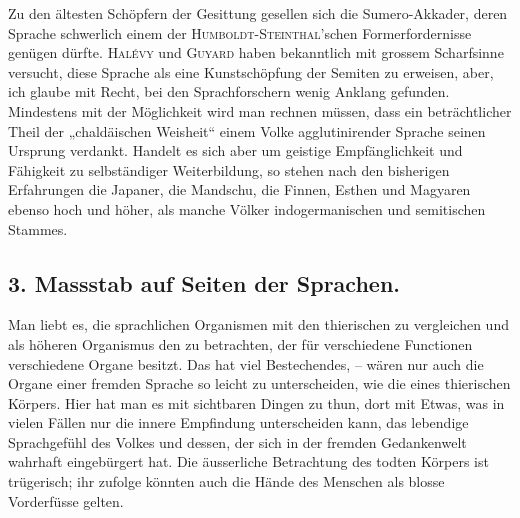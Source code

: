 
Zu den ältesten Schöpfern der Gesittung gesellen sich die Sumero-Akkader, deren Sprache schwerlich einem der \textsc{Humboldt-Steinthal}’schen Formerfordernisse genügen dürfte. \textsc{Halévy} und \textsc{Guyard} haben bekanntlich mit grossem Scharfsinne versucht, diese Sprache als eine Kunstschöpfung der Semiten zu erweisen, aber, ich glaube mit Recht, bei den Sprachforschern wenig Anklang gefunden. Mindestens mit der Möglichkeit wird man rechnen müssen, dass ein beträchtlicher Theil der „chaldäischen Weisheit“ einem Volke agglutinirender Sprache seinen Ursprung verdankt. Handelt es sich aber um geistige Empfänglichkeit und Fähigkeit zu selbständiger Weiterbildung, so stehen nach den bisherigen Erfahrungen die Japaner, die Mandschu, die Finnen, Esthen und Magyaren ebenso hoch und höher, als manche Völker indogermanischen und semitischen Stammes. 

\subsection*{3. Massstab auf Seiten der Sprachen.}\label{IV.IV.3}

Man liebt es, die sprachlichen Organismen mit den thierischen zu vergleichen und als höheren Organismus den zu betrachten, der für verschiedene Functionen verschiedene Organe besitzt. Das hat viel Bestechendes, – wären nur auch die Organe einer fremden Sprache so leicht zu unterscheiden, wie die eines \label{sp.390} thierischen Körpers. Hier hat man es mit sichtbaren Dingen zu thun, dort mit Etwas, was in vielen Fällen nur die innere Empfindung unterscheiden kann, das lebendige Sprachgefühl des Volkes und dessen, der sich in der fremden Gedankenwelt wahrhaft eingebürgert hat. Die äusserliche Betrachtung des todten Körpers ist trügerisch; ihr zufolge könnten auch die Hände des Menschen als blosse Vorderfüsse gelten.


